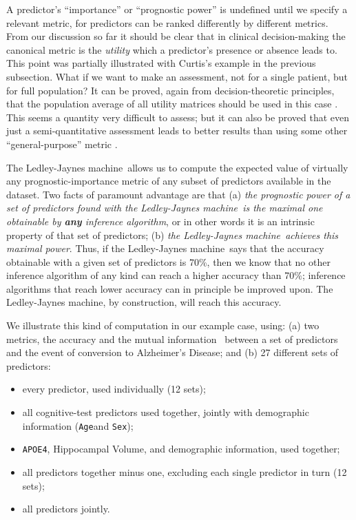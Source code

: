 \documentclass[utf8]{FrontiersinHarvard} %
\newcommand*{\sect}{\S}%
\newcommand*{\cf}{{cf.}}
\renewcommand*{\|}[1][]{\nonscript\:#1\vert\nonscript\:\mathopen{}}
\newcommand*{\age}{\texttt{Age}}
\newcommand*{\sex}{\texttt{Sex}}
\newcommand*{\apoe}{\texttt{APOE4}}
\newcommand*{\ad}{Alzheimer's Disease}
\newcommand*{\ljm}{Ledley-Jaynes machine}
\begin{document}
A predictor's \enquote{importance} or \enquote{prognostic power} is undefined until we specify a relevant metric, for predictors can be ranked differently by different metrics. From our discussion so far it should be clear that in clinical decision-making the canonical metric is the \emph{utility} which a predictor's presence or absence leads to. This point was partially illustrated with Curtis's example in the previous subsection. What if we want to make an assessment, not for a single patient, but for full population? It can be proved, again from decision-theoretic principles, that the population average of all utility matrices should be used in this case \citep[\cf][\sect~4.1]{dyrlandetal2022}. This seems a quantity very difficult to assess; but it can also be proved that even just a semi-quantitative assessment leads to better results than using some other \enquote{general-purpose} metric \citep[\sect~4.2]{dyrlandetal2022}.

The \ljm\ allows us to compute the expected value of virtually any prognostic-importance metric of any subset of predictors available in the dataset. Two facts of paramount advantage are that (a) \emph{the prognostic power of a set of predictors found with the \ljm\ is the maximal one obtainable by \textbf{any} inference algorithm}, or in other words it is an intrinsic property of that set of predictors; (b) \emph{the \ljm\ achieves this maximal power}. Thus, if the \ljm\ says that the accuracy obtainable with a given set of predictors is 70\%, then we know that no other inference algorithm of any kind can reach a higher accuracy than 70\%; inference algorithms that reach lower accuracy can in principle be improved upon. The \ljm, by construction, will reach this accuracy.

We illustrate this kind of computation in our example case, using: (a) two metrics, the accuracy and the mutual information~\citep{shannon1948,coveretal1991_r2006} between a set of predictors and the event of conversion to \ad; and (b) 27 different sets of predictors:
\begin{itemize}
\item every predictor, used individually (12 sets);
\item all cognitive-test predictors used together, jointly with demographic information (\age and \sex);
\item \apoe, Hippocampal Volume, and demographic information, used together;
\item all predictors together minus one, excluding each single predictor in turn (12 sets);
\item all predictors jointly.
\end{itemize}
\end{document}
